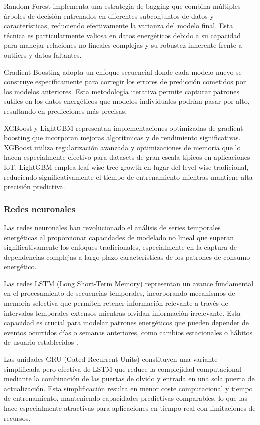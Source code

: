 Random Forest implementa una estrategia de bagging que combina múltiples árboles de decisión entrenados en diferentes subconjuntos de datos y características, reduciendo efectivamente la varianza del modelo final. Esta técnica es particularmente valiosa en datos energéticos debido a su capacidad para manejar relaciones no lineales complejas y su robustez inherente frente a outliers y datos faltantes.

Gradient Boosting adopta un enfoque secuencial donde cada modelo nuevo se construye específicamente para corregir los errores de predicción cometidos por los modelos anteriores. Esta metodología iterativa permite capturar patrones sutiles en los datos energéticos que modelos individuales podrían pasar por alto, resultando en predicciones más precisas.

XGBoost y LightGBM representan implementaciones optimizadas de gradient boosting que incorporan mejoras algorítmicas y de rendimiento significativas. XGBoost utiliza regularización avanzada y optimizaciones de memoria que lo hacen especialmente efectivo para datasets de gran escala típicos en aplicaciones IoT. LightGBM emplea leaf-wise tree growth en lugar del level-wise tradicional, reduciendo significativamente el tiempo de entrenamiento mientras mantiene alta precisión predictiva.

\subsubsection{Redes neuronales}

Las redes neuronales han revolucionado el análisis de series temporales energéticas al proporcionar capacidades de modelado no lineal que superan significativamente los enfoques tradicionales, especialmente en la captura de dependencias complejas a largo plazo características de los patrones de consumo energético.

Las redes LSTM (Long Short-Term Memory) representan un avance fundamental en el procesamiento de secuencias temporales, incorporando mecanismos de memoria selectiva que permiten retener información relevante a través de intervalos temporales extensos mientras olvidan información irrelevante. Esta capacidad es crucial para modelar patrones energéticos que pueden depender de eventos ocurridos días o semanas anteriores, como cambios estacionales o hábitos de usuario establecidos \cite{shi2018deep}.

Las unidades GRU (Gated Recurrent Units) constituyen una variante simplificada pero efectiva de LSTM que reduce la complejidad computacional mediante la combinación de las puertas de olvido y entrada en una sola puerta de actualización. Esta simplificación resulta en menor coste computacional y tiempo de entrenamiento, manteniendo capacidades predictivas comparables, lo que las hace especialmente atractivas para aplicaciones en tiempo real con limitaciones de recursos.

